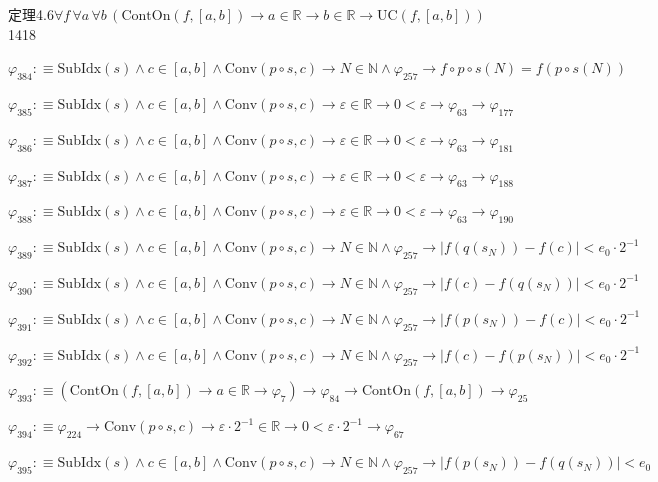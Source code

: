 \begin{fullproof}{定理4.6}{$\forall f\,\forall a\,\forall b\,(\mathrm{ContOn}(f,[a,b]) \to a \in \mathbb{R} \to b \in \mathbb{R} \to \mathrm{UC}(f,[a,b]))$}{1418}
\begin{abbrevlist}
\item $\varphi_{384} :\equiv \mathrm{SubIdx}(s) \land c \in [a,b] \land \mathrm{Conv}(p \circ s,c) \to N \in \mathbb{N} \land \varphi_{257} \to f \circ p \circ s(N) = f(p \circ s(N))$
\item $\varphi_{385} :\equiv \mathrm{SubIdx}(s) \land c \in [a,b] \land \mathrm{Conv}(p \circ s,c) \to \varepsilon \in \mathbb{R} \to 0 < \varepsilon \to \varphi_{63} \to \varphi_{177}$
\item $\varphi_{386} :\equiv \mathrm{SubIdx}(s) \land c \in [a,b] \land \mathrm{Conv}(p \circ s,c) \to \varepsilon \in \mathbb{R} \to 0 < \varepsilon \to \varphi_{63} \to \varphi_{181}$
\item $\varphi_{387} :\equiv \mathrm{SubIdx}(s) \land c \in [a,b] \land \mathrm{Conv}(p \circ s,c) \to \varepsilon \in \mathbb{R} \to 0 < \varepsilon \to \varphi_{63} \to \varphi_{188}$
\item $\varphi_{388} :\equiv \mathrm{SubIdx}(s) \land c \in [a,b] \land \mathrm{Conv}(p \circ s,c) \to \varepsilon \in \mathbb{R} \to 0 < \varepsilon \to \varphi_{63} \to \varphi_{190}$
\item $\varphi_{389} :\equiv \mathrm{SubIdx}(s) \land c \in [a,b] \land \mathrm{Conv}(p \circ s,c) \to N \in \mathbb{N} \land \varphi_{257} \to \lvert f(q(s_{N})) - f(c) \rvert < e_{0} \cdot 2^{-1}$
\item $\varphi_{390} :\equiv \mathrm{SubIdx}(s) \land c \in [a,b] \land \mathrm{Conv}(p \circ s,c) \to N \in \mathbb{N} \land \varphi_{257} \to \lvert f(c) - f(q(s_{N})) \rvert < e_{0} \cdot 2^{-1}$
\item $\varphi_{391} :\equiv \mathrm{SubIdx}(s) \land c \in [a,b] \land \mathrm{Conv}(p \circ s,c) \to N \in \mathbb{N} \land \varphi_{257} \to \lvert f(p(s_{N})) - f(c) \rvert < e_{0} \cdot 2^{-1}$
\item $\varphi_{392} :\equiv \mathrm{SubIdx}(s) \land c \in [a,b] \land \mathrm{Conv}(p \circ s,c) \to N \in \mathbb{N} \land \varphi_{257} \to \lvert f(c) - f(p(s_{N})) \rvert < e_{0} \cdot 2^{-1}$
\item $\varphi_{393} :\equiv (\mathrm{ContOn}(f,[a,b]) \to a \in \mathbb{R} \to \varphi_{7}) \to \varphi_{84} \to \mathrm{ContOn}(f,[a,b]) \to \varphi_{25}$
\item $\varphi_{394} :\equiv \varphi_{224} \to \mathrm{Conv}(p \circ s,c) \to \varepsilon \cdot 2^{-1} \in \mathbb{R} \to 0 < \varepsilon \cdot 2^{-1} \to \varphi_{67}$
\item $\varphi_{395} :\equiv \mathrm{SubIdx}(s) \land c \in [a,b] \land \mathrm{Conv}(p \circ s,c) \to N \in \mathbb{N} \land \varphi_{257} \to \lvert f(p(s_{N})) - f(q(s_{N})) \rvert < e_{0}$

\end{abbrevlist}
\end{fullproof}
